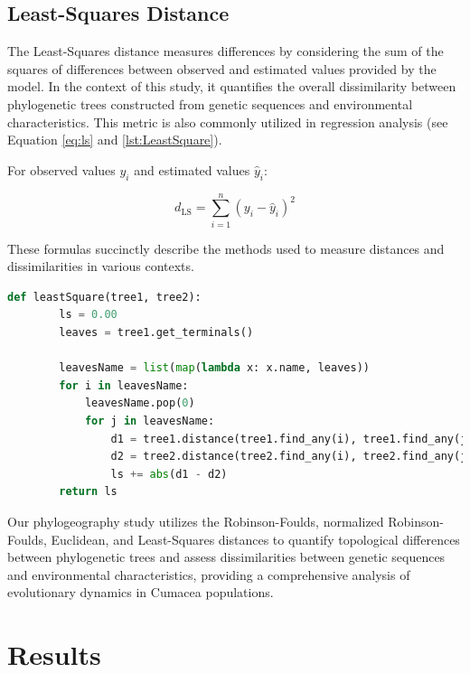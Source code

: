 \subsection{Least-Squares Distance}\label{LS}
The Least-Squares distance measures differences by considering the sum of the squares of differences between observed and estimated values provided by the model. In the context of this study, it quantifies the overall dissimilarity between phylogenetic trees constructed from genetic sequences and environmental characteristics. This metric is also commonly utilized in regression analysis (see Equation \eqref{eq:ls} and \autoref{lst:LeastSquare}).

For observed values $y_i$ and estimated values $\hat{y}_i$:

\begin{equation}\label{eq:ls}
    d_{\text{LS}} = \sum_{i=1}^{n} (y_i - \hat{y}_i)^2
\end{equation}

These formulas succinctly describe the methods used to measure distances and dissimilarities in various contexts.

\begin{lstlisting}[label=lst:LeastSquare,language=Python,caption=Python script for calculating the Least-Square distance using the ete3 package in the aPhyloGeo package]
    def leastSquare(tree1, tree2):
        ls = 0.00
        leaves = tree1.get_terminals()

        leavesName = list(map(lambda x: x.name, leaves))
        for i in leavesName:
            leavesName.pop(0)
            for j in leavesName:
                d1 = tree1.distance(tree1.find_any(i), tree1.find_any(j))
                d2 = tree2.distance(tree2.find_any(i), tree2.find_any(j))
                ls += abs(d1 - d2)
        return ls
\end{lstlisting}

Our phylogeography study utilizes the Robinson-Foulds, normalized Robinson-Foulds, Euclidean, and Least-Squares distances to quantify topological differences between phylogenetic trees and assess dissimilarities between genetic sequences and environmental characteristics, providing a comprehensive analysis of evolutionary dynamics in Cumacea populations.

\section{Results}\label{results}

